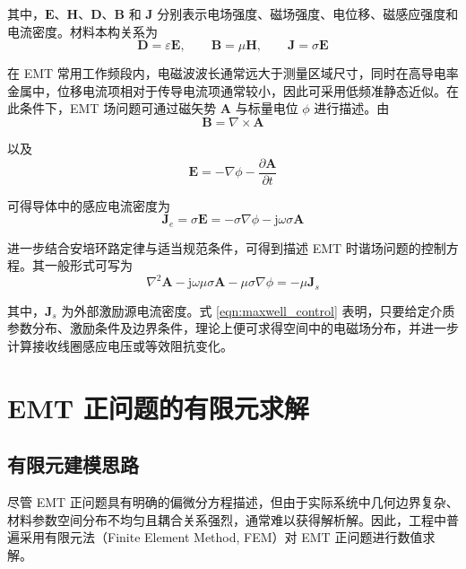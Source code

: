 其中，$\mathbf{E}$、$\mathbf{H}$、$\mathbf{D}$、$\mathbf{B}$ 和 $\mathbf{J}$ 分别表示电场强度、磁场强度、电位移、磁感应强度和电流密度。材料本构关系为
\begin{equation}
\label{eqn:constitutive}
\mathbf{D}=\varepsilon\mathbf{E}, \qquad
\mathbf{B}=\mu\mathbf{H}, \qquad
\mathbf{J}=\sigma\mathbf{E}
\end{equation}

在 EMT 常用工作频段内，电磁波波长通常远大于测量区域尺寸，同时在高导电率金属中，位移电流项相对于传导电流项通常较小，因此可采用低频准静态近似。在此条件下，EMT 场问题可通过磁矢势 $\mathbf{A}$ 与标量电位 $\phi$ 进行描述。由
\begin{equation}
\label{eqn:B_from_A}
\mathbf{B}=\nabla\times\mathbf{A}
\end{equation}

以及
\begin{equation}
\label{eqn:E_from_A_phi}
\mathbf{E}=-\nabla\phi-\frac{\partial \mathbf{A}}{\partial t}
\end{equation}

可得导体中的感应电流密度为
\begin{equation}
\label{eqn:eddy_current}
\mathbf{J}_e=\sigma\mathbf{E}
=-\sigma\nabla\phi-\mathrm{j}\omega\sigma\mathbf{A}
\end{equation}

进一步结合安培环路定律与适当规范条件，可得到描述 EMT 时谐场问题的控制方程。其一般形式可写为
\begin{equation}
\label{eqn:maxwell_control}
\nabla^2 \mathbf{A}
-\mathrm{j}\omega\mu\sigma\mathbf{A}
-\mu\sigma\nabla\phi
=
-\mu\mathbf{J}_s
\end{equation}

其中，$\mathbf{J}_s$ 为外部激励源电流密度。式 \eqref{eqn:maxwell_control} 表明，只要给定介质参数分布、激励条件及边界条件，理论上便可求得空间中的电磁场分布，并进一步计算接收线圈感应电压或等效阻抗变化。

\section{EMT 正问题的有限元求解}

\subsection{有限元建模思路}

尽管 EMT 正问题具有明确的偏微分方程描述，但由于实际系统中几何边界复杂、材料参数空间分布不均匀且耦合关系强烈，通常难以获得解析解。因此，工程中普遍采用有限元法（Finite Element Method, FEM）对 EMT 正问题进行数值求解。

